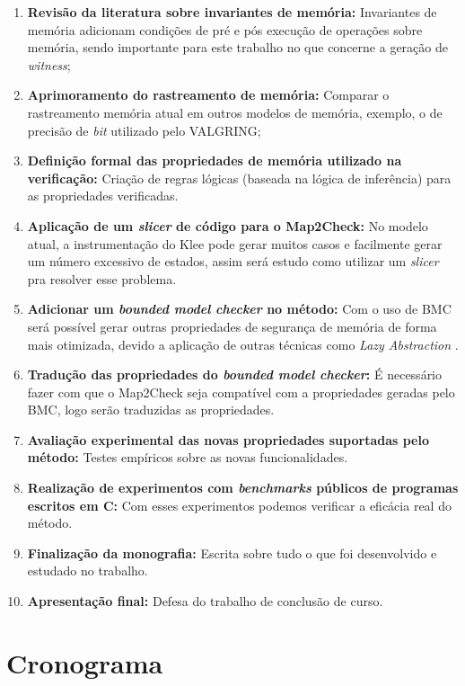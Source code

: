 \begin{enumerate}
  \item \textbf{Revisão da literatura sobre invariantes de memória:} Invariantes de memória adicionam condições de pré e pós execução de operações sobre memória, sendo importante para 
  este trabalho no que concerne a geração de \textit{witness}; 
  \item \textbf{Aprimoramento do rastreamento de memória:} Comparar o rastreamento memória atual em outros modelos de memória, exemplo, o de precisão de \textit{bit} utilizado pelo VALGRING;
  \item \textbf{Definição formal das propriedades de memória utilizado na verificação:} Criação de regras lógicas (baseada na lógica de inferência) para as propriedades verificadas. 
  \item \textbf{Aplicação de um \textit{slicer} de código para o Map2Check:} No modelo atual, a instrumentação do Klee pode gerar muitos casos e facilmente gerar um número excessivo de estados, assim será estudo como utilizar um \textit{slicer} pra resolver esse problema.
  \item \textbf{Adicionar um \textit{bounded model checker} no método:} Com o uso de BMC será possível gerar outras propriedades de segurança de memória de forma mais otimizada, devido a aplicação de outras técnicas como \textit{Lazy Abstraction} \cite{Cordeiro_ecs_2011}.
  \item \textbf{Tradução das propriedades do \textit{bounded model checker}:} É necessário fazer com que o Map2Check seja compatível com a propriedades geradas pelo BMC, logo serão traduzidas as propriedades.
  \item \textbf{Avaliação experimental das novas propriedades suportadas pelo método:} Testes empíricos sobre as novas funcionalidades.
  \item \textbf{Realização de experimentos com \textit{benchmarks} públicos de programas escritos em C:} Com esses experimentos podemos verificar a eficácia real do método.
  \item \textbf{Finalização da monografia:} Escrita sobre tudo o que foi desenvolvido e estudado no trabalho.
  \item \textbf{Apresentação final:} Defesa do trabalho de conclusão de curso.
\end{enumerate}
	
\section{Cronograma}

